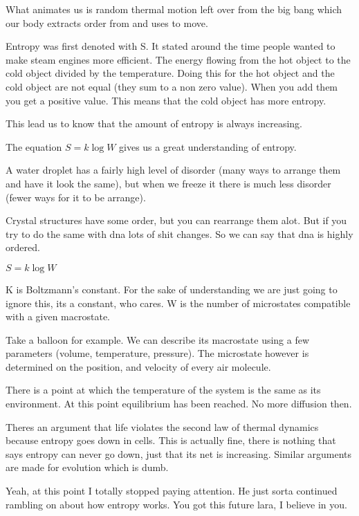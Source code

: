 \documentclass{article}
\begin{document}
What animates us is random thermal motion left over from the big bang which our body extracts order from and uses to move.



Entropy was first denoted with S. It stated around the time people wanted to make steam engines more efficient. The energy flowing from the hot object to the cold object divided by the temperature. Doing this for the hot object and the cold object are not equal (they sum to a non zero value). When you add them you get a positive value. This means that the cold object has more entropy.

This lead us to know that the amount of entropy is always increasing.


The equation $S=k\log W$ gives us a great understanding of entropy.


A water droplet has a fairly high level of disorder (many ways to arrange them and have it look the same), but when we freeze it there is much less disorder (fewer ways for it to be arrange).


Crystal structures have some order, but you can rearrange them alot. But if you try to do the same with dna lots of shit changes. So we can say that dna is highly ordered.


$S=k\log W$

K is Boltzmann's constant. For the sake of understanding we are just going to ignore this, its a constant, who cares. W is the number of microstates compatible with a given macrostate.


Take a balloon for example. We can describe its macrostate using a few parameters (volume, temperature, pressure). The microstate however is determined on the position, and velocity of every air molecule.


There is a point at which the temperature of the system is the same as its environment. At this point equilibrium has been reached. No more diffusion then.


Theres an argument that life violates the second law of thermal dynamics because entropy goes down in cells. This is actually fine, there is nothing that says entropy can never go down, just that its net is increasing. Similar arguments are made for evolution which is dumb.

Yeah, at this point I totally stopped paying attention. He just sorta continued rambling on about how entropy works. You got this future lara, I believe in you.
\end{document}
